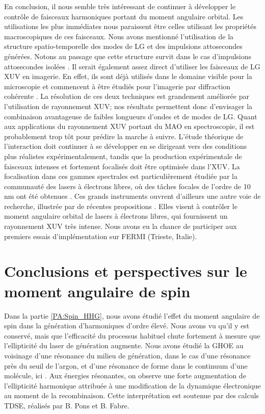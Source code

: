 En conclusion, il nous semble très intéressant de continuer à développer le contrôle de faisceaux harmoniques portant du moment angulaire orbital. Les utilisations les plus immédiates nous paraissent être celles utilisant les propriétés macroscopiques de ces faisceaux. Nous avons mentionné l'utilisation de la structure spatio-temporelle des modes de LG et des impulsions attosecondes générées. Notons au passage que cette structure survit dans le cas d'impulsions attosecondes isolées . Il serait également assez direct d'utiliser les faisceaux de LG XUV en imagerie. En effet, ils sont déjà utilisés dans le domaine visible pour la microscopie  et commencent à être étudiés pour l'imagerie par diffraction cohérente . La résolution de ces deux techniques est grandement améliorée par l'utilisation de rayonnement XUV; nos résultats permettent donc d'envisager la combinaison avantageuse de faibles longueurs d'ondes et de modes de LG. \linebreak
Quant aux applications du rayonnement XUV portant du MAO en spectroscopie, il est probablement trop tôt pour prédire la marche à suivre. L'étude théorique de l'interaction doit continuer à se développer en se dirigeant vers des conditions plus réalistes expérimentalement, tandis que la production expérimentale de faisceaux intenses et fortement focalisés doit être optimisée dans l'XUV. La focalisation dans ces gammes spectrales est particulièrement étudiée par la communauté des lasers à électrons libres, où des tâches focales de l'ordre de 10 nm ont été obtenues . Ces grands instruments ouvrent d'ailleurs une autre voie de recherche, illustrée par de récentes propositions . Elles visent à contrôler le moment angulaire orbital de lasers à électrons libres, qui fournissent un rayonnement XUV très intense. Nous avons eu la chance de participer aux premiers essais d'implémentation sur FERMI (Trieste, Italie).

\section{Conclusions et perspectives sur le moment angulaire de spin}
Dans la partie \ref{PA:Spin_HHG}, nous avons étudié l'effet du moment angulaire de spin dans la génération d'harmoniques d'ordre élevé. Nous avons vu qu'il y est conservé, mais que l'efficacité du processus habituel chute fortement à mesure que l'ellipticité du laser de génération augmente. Nous avons étudié la GHOE au voisinage d'une résonance du milieu de génération, dans le cas d'une résonance près du seuil de l'argon, et d'une résonance de forme dans le continuum d'une molécule, ici . Aux énergies résonantes, on observe une forte augmentation de l'ellipticité harmonique attribuée à une modification de la dynamique électronique au moment de la recombinaison. Cette interprétation est soutenue par des calculs TDSE, réalisés par B. Pons et B. Fabre. 

